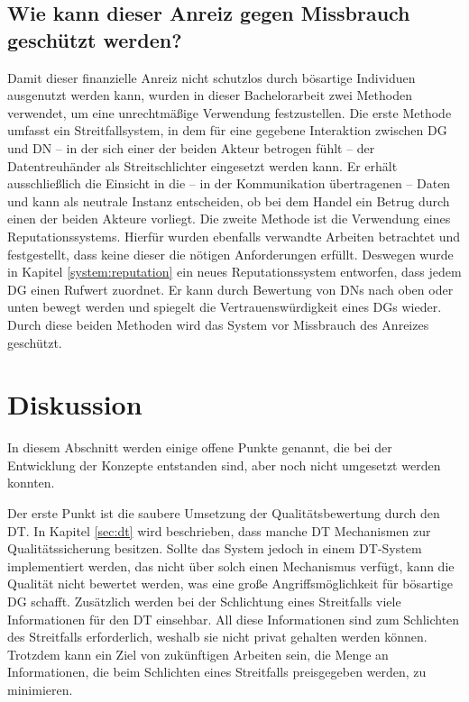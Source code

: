 \documentclass[
	fontsize=11pt,
	headings=small,
	parskip=half,           %
	bibliography=totoc,
	numbers=noenddot,       %
	open=any,               %
]{scrreprt}
\begin{document}
\subsection{Wie kann dieser Anreiz gegen Missbrauch geschützt werden?}
Damit dieser finanzielle Anreiz nicht schutzlos durch bösartige Individuen ausgenutzt werden kann, wurden in dieser Bachelorarbeit zwei Methoden verwendet, um eine unrechtmäßige Verwendung festzustellen. Die erste Methode umfasst ein Streitfallsystem, in dem für eine gegebene Interaktion zwischen DG und DN -- in der sich einer der beiden Akteur betrogen fühlt -- der Datentreuhänder als Streitschlichter eingesetzt werden kann. Er erhält ausschließlich die Einsicht in die -- in der Kommunikation übertragenen -- Daten und kann als neutrale Instanz entscheiden, ob bei dem Handel ein Betrug durch einen der beiden Akteure vorliegt. Die zweite Methode ist die Verwendung eines Reputationssystems. Hierfür wurden ebenfalls verwandte Arbeiten betrachtet und festgestellt, dass keine dieser die nötigen Anforderungen erfüllt. Deswegen wurde in Kapitel \ref{system:reputation} ein neues Reputationssystem entworfen, dass jedem DG einen Rufwert zuordnet. Er kann durch Bewertung von DNs nach oben oder unten bewegt werden und spiegelt die Vertrauenswürdigkeit eines DGs wieder. Durch diese beiden Methoden wird das System vor Missbrauch des Anreizes geschützt.
\section{Diskussion}
\label{sec:discussion}
In diesem Abschnitt werden einige offene Punkte genannt, die bei der Entwicklung der Konzepte entstanden sind, aber noch nicht umgesetzt werden konnten. 

Der erste Punkt ist die saubere Umsetzung der Qualitätsbewertung durch den DT. In Kapitel \ref{sec:dt} wird beschrieben, dass manche DT Mechanismen zur Qualitätssicherung besitzen. Sollte das System jedoch in einem DT-System implementiert werden, das nicht über solch einen Mechanismus verfügt, kann die Qualität nicht bewertet werden, was eine große Angriffsmöglichkeit für bösartige DG schafft. Zusätzlich werden bei der Schlichtung eines Streitfalls viele Informationen für den DT einsehbar. All diese Informationen sind zum Schlichten des Streitfalls erforderlich, weshalb sie nicht privat gehalten werden können. Trotzdem kann ein Ziel von zukünftigen Arbeiten sein, die Menge an Informationen, die beim Schlichten eines Streitfalls preisgegeben werden, zu minimieren.
\end{document}
